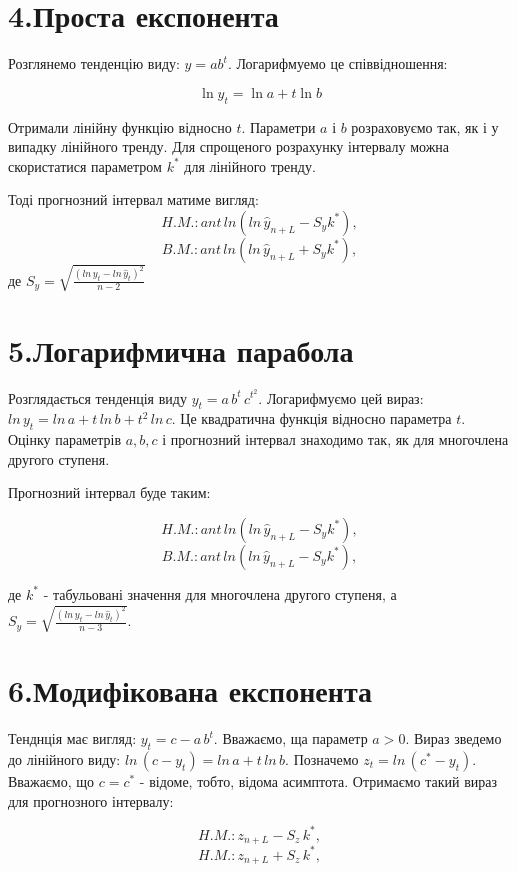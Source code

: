 \documentclass[a4paper, fontsize=10pt, oneside]{article}
\begin{document}
\chapter{\Large \bf 4.Проста експонента} 

Розглянемо тенденцію виду: $y = ab^t$. Логарифмуемо це співвідношення:

$$ \ln{y_{t}} = \ln{a} + t\ln{b}$$

Отримали лінійну функцію відносно $t$. Параметри $a$ і $b$ розраховуємо так, як і у випадку лінійного тренду. Для спрощеного розрахунку інтервалу можна скористатися параметром $k^{*}$ для лінійного тренду.

Тоді прогнозний інтервал матиме вигляд:
$$H.M.:ant \, ln{(ln{\,\hat{y}_{n+L}-S_{y}k^{*}})},$$
$$B.M.:ant \, ln{(ln{\,\hat{y}_{n+L}+S_{y}k^{*}})},$$
\noindent де $S_{y} = \sqrt{\frac{(ln{\,y_{t}} - ln{\,\hat{y}_{t}})^2}{n-2}}$

\chapter{\Large \bf 5.Логарифмична парабола}

Розглядається тенденція виду $y_{t} = a\,b^{t}\,c^{t^2}$. Логарифмуємо цей вираз: $ln{\,y_{t}} = ln{\,a} + t\,ln{\,b} + t^2\,ln{\,c}$. Це квадратична функція відносно параметра $t$. Оцінку параметрів $a, b, c$ і прогнозний інтервал знаходимо так, як для многочлена другого ступеня.

Прогнозний інтервал буде таким:

$$H.M.:ant \, ln{(ln{\,\hat{y}_{n+L}-S_{y}k^{*}})},$$
$$B.M.:ant \, ln{(ln{\,\hat{y}_{n+L}-S_{y}k^{*}})},$$

\noindent де $k^{*}$ - табульовані значення для многочлена другого ступеня, а $S_{y} = \sqrt{\frac{(ln{\,y_{t}} - ln{\,\hat{y}_{t}})^2}{n-3}}.$

\chapter{\Large \bf 6.Модифікована експонента}

Тенднція має вигляд: $y_{t} = c - a\,b^{t}.$ Вважаємо, ща параметр $a>0.$ Вираз зведемо до лінійного виду: $ln{\,(c - y_{t})} = ln{\, a} + t\,ln{\,b}.$ Позначемо $z_{t} = ln{\,(c^{*} - y_{t})}.$ Вважаємо, що $c = c^{*}$ - відоме, тобто, відома асимптота. Отримаємо такий вираз для прогнозного інтервалу:

$$H.M.:z_{n+L} - S_{z}\,k^{*},$$
$$H.M.:z_{n+L} + S_{z}\,k^{*},$$
\end{document}
